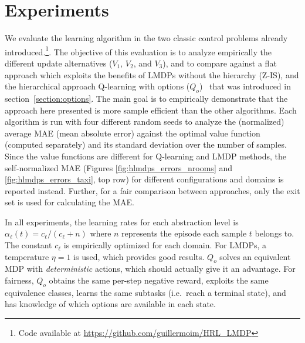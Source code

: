 \section{Experiments}
\label{section:hlmdps_experiments}
We evaluate the learning algorithm in the two classic control problems already introduced.\footnote{Code available at \url{https://github.com/guillermoim/HRL\_LMDP}}.
The objective of this evaluation is to analyze empirically the different update alternatives ($V_1$, $V_2$, and $V_3$), and
to compare against a flat approach which exploits the benefits of LMDPs without the hierarchy (Z-IS), and the hierarchical approach Q-learning with options ($Q_o$)~\citep{Sutton1999} that was introduced in section~\ref{section:options}. The main goal is to empirically demonstrate that the approach here presented is more sample efficient than the other algorithms. Each algorithm is run with four different random seeds to analyze the (normalized) average MAE (mean absolute error) against the optimal value function (computed separately) and its standard deviation over the number of samples. Since the value functions are different for Q-learning and LMDP methods, the self-normalized MAE (Figures \ref{fig:hlmdps_errors_nrooms} and \ref{fig:hlmdps_errors_taxi}, top row) for different configurations and domains is reported instead. Further, for a fair comparison between approaches, only the exit set is used for calculating the MAE.


In all experiments, the learning rates for each abstraction level is $\alpha_\ell(t) = c_\ell / (c_\ell + n)$ where $n$ represents the episode each sample $t$ belongs to. The constant $c_\ell$ is empirically optimized for each domain. For LMDPs, a temperature $\eta=1$ is used, which provides good results. $Q_o$ solves an equivalent MDP with {\em deterministic} actions, which should actually give it an advantage. For fairness, $Q_o$ obtains the same per-step negative reward, exploits the same equivalence classes, learns the same subtasks (i.e.~reach a terminal state), and has knowledge of which options are available in each state. 

